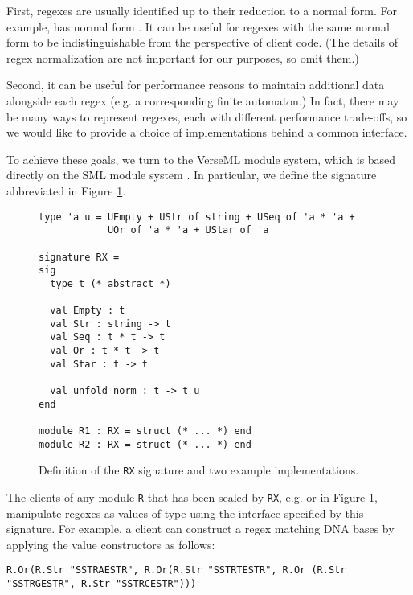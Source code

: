 First, regexes are usually identified up to their reduction to a normal form. For example,  has normal form . It can be useful for regexes with the same normal form to be  indistinguishable from the perspective of client code. (The details of regex normalization are not important for our purposes, so omit them.)

Second, it can be useful for performance reasons to maintain additional data alongside each regex (e.g. a corresponding finite automaton.) In fact, there may be many ways to represent regexes, each with different performance trade-offs, so we would like to provide a choice of implementations behind a common interface.

To achieve these goals, we turn to the VerseML module system, which is based directly on the SML module system \cite{MacQueen:1984:MSM:800055.802036}. In particular, we define the {signature} abbreviated  in Figure \ref{fig:signature-RX}.

\begin{figure}[ht]
\begin{lstlisting}[deletekeywords={case}]
type 'a u = UEmpty + UStr of string + USeq of 'a * 'a + 
            UOr of 'a * 'a + UStar of 'a

signature RX = 
sig
  type t (* abstract *)

  val Empty : t
  val Str : string -> t
  val Seq : t * t -> t
  val Or : t * t -> t
  val Star : t -> t

  val unfold_norm : t -> t u
end

module R1 : RX = struct (* ... *) end
module R2 : RX = struct (* ... *) end
\end{lstlisting}
\vspace{-5px}
\caption{Definition of the \lstinline{RX} signature and two example implementations.}
\label{fig:signature-RX}
\end{figure}

The clients of any module \lstinline{R} that has been sealed by \lstinline{RX}, e.g.  or   in Figure \ref{fig:signature-RX}, manipulate regexes as values of type  using the interface specified by this signature. For example, a client can construct a regex matching DNA bases by applying the value constructors as follows:
\begin{lstlisting}[numbers=none]
R.Or(R.Str "SSTRAESTR", R.Or(R.Str "SSTRTESTR", R.Or (R.Str "SSTRGESTR", R.Str "SSTRCESTR")))
\end{lstlisting}

